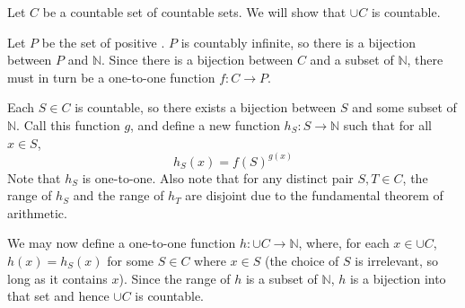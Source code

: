 \documentclass[12pt]{article}
\begin{document}

Let $C$ be a countable set of countable sets.  We will show that $\cup C$ is countable.

Let $P$ be the set of positive .  $P$ is countably infinite, so there is a bijection between $P$ and $\mathbb{N}$.  Since there is a bijection between $C$ and a subset of $\mathbb{N}$, there must in turn be a one-to-one function $f: C \rightarrow P$.

Each $S \in C$ is countable, so there exists a bijection between $S$ and some subset of $\mathbb{N}$.  Call this function $g$, and define a new function $h_S: S \rightarrow \mathbb{N}$ such that for all $x \in S$,
$$h_S(x) = f(S)^{g(x)}$$
Note that $h_S$ is one-to-one.  Also note that for any distinct pair $S, T \in C$, the range of $h_S$ and the range of $h_T$ are disjoint due to the fundamental theorem of arithmetic.

We may now define a one-to-one function $h: \cup C \rightarrow \mathbb{N}$, where, for each $x \in \cup C$, $h(x) = h_S(x)$ for some $S \in C$ where $x \in S$ (the choice of $S$ is irrelevant, so long as it contains $x$).  Since the range of $h$ is a subset of $\mathbb{N}$, $h$ is a bijection into that set and hence $\cup C$ is countable.
\end{document}
